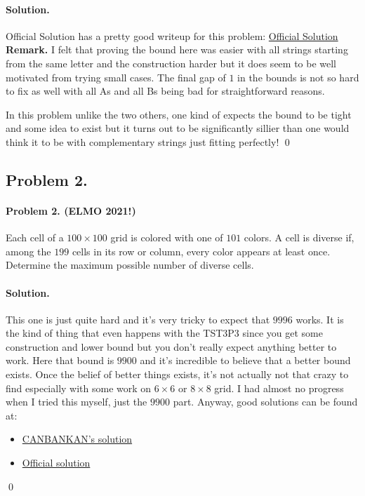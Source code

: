 \documentclass[12pt]{article}
\newenvironment{solution}
{\paragraph{Solution.}}
{\qed\eject}
\begin{document}
\begin{solution}
    Official Solution has a pretty good writeup for this problem: \href{https://www.egmo.org/egmos/egmo12/solutions.pdf}{Official Solution}\\

    \textbf{Remark.} I felt that proving the bound here was easier with all strings starting from the same letter and the construction harder but it does seem to be well motivated from trying small cases. The final gap of $1$ in the bounds is not so hard to fix as well with all As and all Bs being bad for straightforward reasons. 

    In this problem unlike the two others, one kind of expects the bound to be tight and some idea to exist but it turns out to be significantly sillier than one would think it to be with complementary strings just fitting perfectly!
\end{solution}

\subsection*{Problem 2.}

\paragraph*{\textbf{Problem 2. (ELMO 2021!)}} Each cell of a $100\times 100$ grid is colored with one of $101$ colors. A cell is diverse if, among the $199$ cells in its row or column, every color appears at least once. Determine the maximum possible number of diverse cells.\\

\begin{solution}
    This one is just quite hard and it's very tricky to expect that $9996$ works. It is the kind of thing that even happens with the TST3P3 since you get some construction and lower bound but you don't really expect anything better to work. Here that bound is $9900$ and it's incredible to believe that a better bound exists. Once the belief of better things exists, it's not actually not that crazy to find especially with some work on $6\times 6$ or $8\times 8$ grid. I had almost no progress when I tried this myself, just the $9900$ part. Anyway, good solutions can be found at:
    \begin{itemize}
        \item \href{https://artofproblemsolving.com/community/c6h2600391p22438297}{CANBANKAN's solution}
        \item \href{https://artofproblemsolving.com/community/c6h2600391p22438595}{Official solution}
    \end{itemize}
\end{solution}
\end{document}
